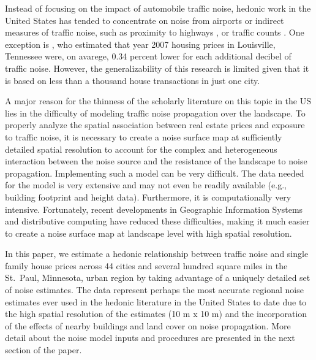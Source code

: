 \documentclass{article}\usepackage{graphicx, color}
\begin{document}
Instead of focusing on the impact of automobile traffic noise, hedonic work in the United States has tended to concentrate on noise from airports \citep{Espey2000, McMillen2004, Cohen2008a} or indirect measures of traffic noise, such as proximity to highways \citep{Matthews2007, Chernobai2009, Li2012}, or traffic counts \citep{HughesJr.1992, Larsen2012}. One exception is \citet{Cheng2008}, who estimated that year 2007 housing prices in Louisville, Tennessee were, on avarege, 0.34 percent lower for each additional decibel of traffic noise. However, the generalizability of this research is limited given that it is based on less than a thousand house transactions in just one city. 

A major reason for the thinness of the scholarly literature on this topic in the US lies in the difficulty of modeling traffic noise propagation over the landscape. To properly analyze the spatial association between real estate prices and exposure to traffic noise, it is necessary to create a noise surface map at sufficiently detailed spatial resolution to account for the complex and heterogeneous interaction between the noise source and the resistance of the landscape to noise propagation.  Implementing such a model can be very difficult.  The data needed for the model is very extensive and may not even be readily available (e.g., building footprint and height data).  Furthermore, it is computationally very intensive. Fortunately, recent developments in Geographic Information Systems and distributive computing have reduced these difficulties, making it much easier to create a noise surface map at landscape level with high spatial resolution.  

In this paper, we estimate a hedonic relationship between traffic noise and single family house prices across 44 cities and several hundred square miles in the St.\ Paul, Minnesota, urban region by taking advantage of a uniquely detailed set of noise estimates. The data represent perhaps the most accurate regional noise estimates ever used in the hedonic literature in the United States to date due to the high spatial resolution of the estimates (10 m x 10 m) and the incorporation of the effects of nearby buildings and land cover on noise propagation. More detail about the noise model inputs and procedures are presented in the next section of the paper. 
 
\end{document}
